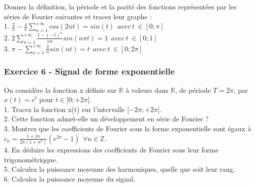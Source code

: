 	Donnez la définition, la période et la parité des fonctions représentées par les séries de Fourier suivantes et tracez leur graphe :\\
	
	1. $	\frac{2}{\pi}-\frac{4}{\pi}\sum_{n=1}^{+\infty}cos(2nt)=sin(t)~~avec~t~\in[0;\pi]$\\
	
	2. $	2\sum_{n=1}^{+\infty}\frac{1-(-1)^{n}}{n \pi}sin(n \pi t)=1~~avec~t~\in[0;1]$ \\
	
	3. $	\pi-\sum_{n=1}^{+\infty}\frac{2}{n}sin(nt)=t~~avec~t~\in[0;2\pi]$ \\
	
	
	\subsubsection{Exercice 6 - Signal de forme exponentielle}
	On considère la fonction x définie sur $\mathbb{R}$ à valeurs dans $\mathbb{R}$, de période $T=2\pi$, par $x(t)=e^{t}$ pour $t\in [0;+2\pi[$.\\
	
	1. Tracez la fonction x(t) sur l'intervalle $[-2\pi;+2\pi[$.\\
	
	2. Cette fonction admet-elle un développement en série de Fourier ?\\
	
	3. Montrez que les coefficients de Fourier sous la forme exponentielle sont égaux à $c_{n}=\frac{1+jn}{2\pi(1+n^{2})}(e^{2\pi}-1)~~\forall n \in \mathbb{Z}$.\\
	
	4. En déduire les expressions des coefficients de Fourier sous leur forme trigonométriqque.\\
	
	5. Calculez la puissance moyenne des harmoniques, quelle que soit leur rang.\\
	
	6. Calculez la puissance moyenne du signal.\\
	

	
	
